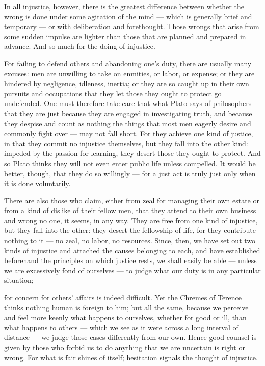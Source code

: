  In all injustice, however, there is the greatest difference between whether the wrong is done under some agitation of the mind — which is generally brief and temporary — or with deliberation and forethought. Those wrongs that arise from some sudden impulse are lighter than those that are planned and prepared in advance. And so much for the doing of injustice.

 For failing to defend others and abandoning one's duty, there are usually many excuses: men are unwilling to take on enmities, or labor, or expense; or they are hindered by negligence, idleness, inertia; or they are so caught up in their own pursuits and occupations that they let those they ought to protect go undefended. One must therefore take care that what Plato says of philosophers — that they are just because they are engaged in investigating truth, and because they despise and count as nothing the things that most men eagerly desire and commonly fight over — may not fall short. For they achieve one kind of justice, in that they commit no injustice themselves, but they fall into the other kind: impeded by the passion for learning, they desert those they ought to protect. And so Plato thinks they will not even enter public life unless compelled. It would be better, though, that they do so willingly — for a just act is truly just only when it is done voluntarily.

 There are also those who claim, either from zeal for managing their own estate or from a kind of dislike of their fellow men, that they attend to their own business and wrong no one, it seems, in any way. They are free from one kind of injustice, but they fall into the other: they desert the fellowship of life, for they contribute nothing to it — no zeal, no labor, no resources. Since, then, we have set out two kinds of injustice and attached the causes belonging to each, and have established beforehand the principles on which justice rests, we shall easily be able — unless we are excessively fond of ourselves — to judge what our duty is in any particular situation;

 for concern for others' affairs is indeed difficult. Yet the Chremes of Terence thinks nothing human is foreign to him; but all the same, because we perceive and feel more keenly what happens to ourselves, whether for good or ill, than what happens to others — which we see as it were across a long interval of distance — we judge those cases differently from our own. Hence good counsel is given by those who forbid us to do anything that we are uncertain is right or wrong. For what is fair shines of itself; hesitation signals the thought of injustice.

